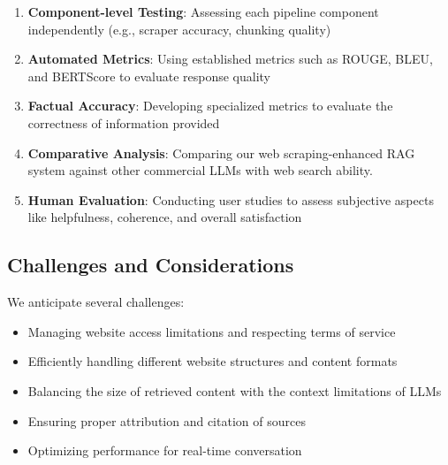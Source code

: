 \documentclass[fleqn,moreauthors,10pt]{ds_report}
\begin{document}
\begin{enumerate}[noitemsep]
    \item \textbf{Component-level Testing}: Assessing each pipeline component independently (e.g., scraper accuracy, chunking quality)
    
    \item \textbf{Automated Metrics}: Using established metrics such as ROUGE, BLEU, and BERTScore to evaluate response quality
    
    \item \textbf{Factual Accuracy}: Developing specialized metrics to evaluate the correctness of information provided
    
    \item \textbf{Comparative Analysis}: Comparing our web scraping-enhanced RAG system against other commercial LLMs with web search ability.
    
    \item \textbf{Human Evaluation}: Conducting user studies to assess subjective aspects like helpfulness, coherence, and overall satisfaction
\end{enumerate}

\subsection*{Challenges and Considerations}
We anticipate several challenges:

\begin{itemize}[noitemsep]
    \item Managing website access limitations and respecting terms of service
    \item Efficiently handling different website structures and content formats
    \item Balancing the size of retrieved content with the context limitations of LLMs
    \item Ensuring proper attribution and citation of sources
    \item Optimizing performance for real-time conversation
\end{itemize}




\end{document}
